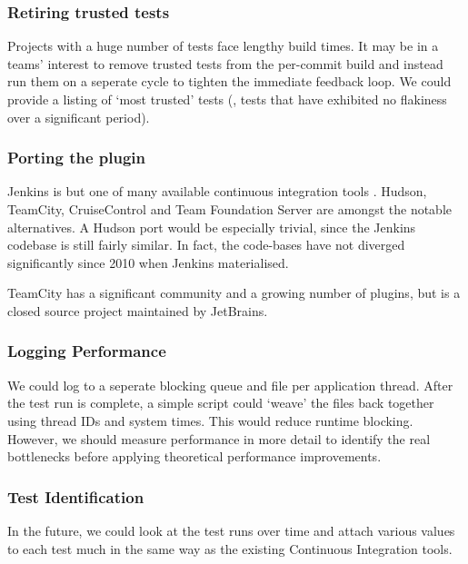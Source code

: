 \subsubsection{Retiring trusted tests}

Projects with a huge number of tests face lengthy build times. It may be in a
teams' interest to remove trusted tests from the per-commit build and instead
run them on a seperate cycle to tighten the immediate feedback loop. We could
provide a listing of {\lq}most trusted{\rq} tests (\ie, tests that have
exhibited no flakiness over a significant period).

\subsubsection{Porting the plugin}

Jenkins is but one of many available continuous integration tools
\cite{ContinuousIntegrationSoftware}. Hudson, TeamCity, CruiseControl and Team
Foundation Server are amongst the notable alternatives. A Hudson port would be
especially trivial, since the Jenkins codebase is still fairly similar. In fact,
the code-bases have not diverged significantly since 2010 when Jenkins
materialised.

TeamCity \cite{TeamCity} has a significant community and a growing number of
plugins, but is a closed source project maintained by JetBrains.

\subsubsection{Logging Performance}

We could log to a seperate blocking queue and file per application thread. After
the test run is complete, a simple script could {\lq}weave{\rq} the files back
together using thread IDs and system times. This would reduce runtime blocking.
However, we should measure performance in more detail to identify the real
bottlenecks before applying theoretical performance improvements.

\subsubsection{\Flaky Test Identification}
In the future, we could look at the test runs over time and attach various
values to each test much in the same way as the existing Continuous Integration
tools.
